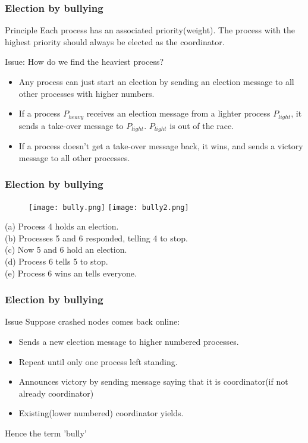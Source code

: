 \begin{frame}
    \frametitle{Election by bullying}
\begin{block}{Principle}
    Each process has an associated priority(weight). The process with the highest priority should always be elected as the coordinator.
\end{block}

\begin{block}{Issue: How do we find the heaviest process?}
    \begin{itemize}
        \item Any process can just start an election by sending an election message to all other processes with higher numbers.
        \item If a process $P_{heavy}$ receives an election message from a lighter process $P_{light}$, it sends a take-over message to $P_{light}$. $P_{light}$ is out of the race.
        \item If a process doesn't get a take-over message back, it wins, and sends a victory message to all other processes.
    \end{itemize}
\end{block}

\end{frame}

\begin{frame}
    \frametitle{Election by bullying}
    \begin{figure}
        \centering
        \texttt{[image: bully.png]}
        \texttt{[image: bully2.png]}
    \end{figure}
(a) Process 4 holds an election. \\
(b) Processes 5 and 6 responded, telling 4 to stop. \\
(c) Now 5 and 6 hold an election. \\
(d) Process 6 tells 5 to stop. \\
(e) Process 6 wins an tells everyone.
\end{frame}

\begin{frame}
    \frametitle{Election by bullying}
    \begin{block}{Issue}
    Suppose crashed nodes comes back online:
    \begin{itemize}
        \item Sends a new election message to higher numbered processes.
        \item Repeat until only one process left standing.
        \item Announces victory by sending message saying that it is coordinator(if not already coordinator)
        \item Existing(lower numbered) coordinator yields.
    \end{itemize}
    \end{block}
    Hence the term 'bully'
\end{frame}

